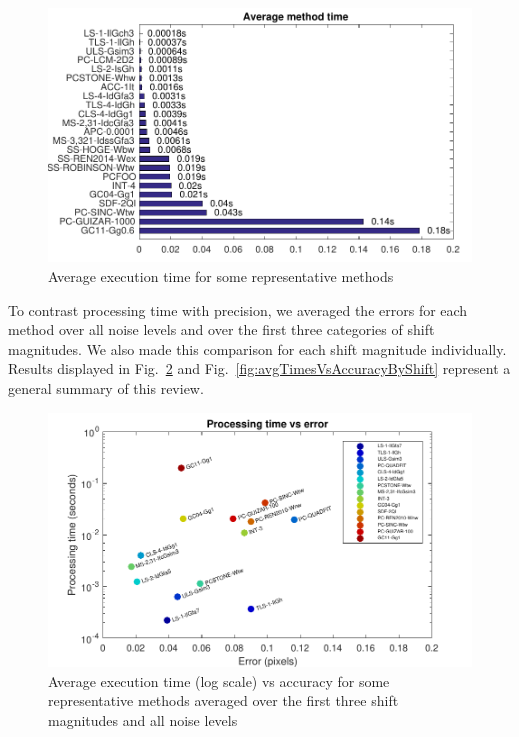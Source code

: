 \begin{figure}[ht!]
	\centering
	\includegraphics[width=.8\textwidth]{img/avgTimes}
	\caption{Average execution time for some representative methods}
	\label{fig:avgTimes}
\end{figure}

To contrast processing time with precision, we averaged the errors for each method over all noise levels and over the first three categories of shift magnitudes. We also made this comparison for each shift magnitude individually. Results displayed in Fig.~\ref{fig:avgTimesVsAccuracy} and Fig.~\ref{fig:avgTimesVsAccuracyByShift} represent a general summary of this review. 

\begin{figure}[ht!]
	\centering
	\includegraphics[width=1\textwidth]{img/avgTimesVsAccuracy}
	\caption{Average execution time (log scale) vs accuracy for some representative methods averaged over the first three shift magnitudes and all noise levels}
	\label{fig:avgTimesVsAccuracy}
\end{figure}

